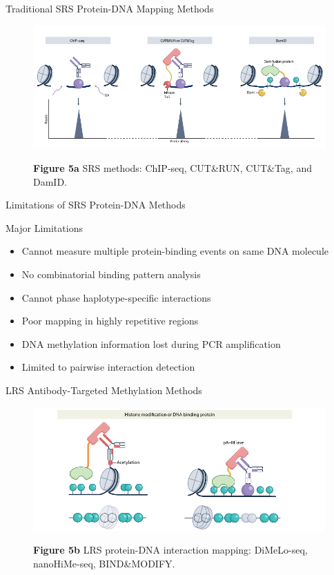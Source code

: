 \documentclass[aspectratio=169]{beamer}
\begin{document}
\begin{frame}{Traditional SRS Protein-DNA Mapping Methods}
  \begin{figure}
    \centering
    \includegraphics[height=0.5\textheight]{figures/fig5a.pdf}

    {\small \textbf{Figure 5a} \textbar{} SRS methods: ChIP-seq, CUT\&RUN, CUT\&Tag, and DamID.}
  \end{figure}
\end{frame}

\begin{frame}{Limitations of SRS Protein-DNA Methods}
  \begin{alertblock}{Major Limitations}
    \begin{itemize}
      \item Cannot measure multiple protein-binding events on same DNA molecule
      \item No combinatorial binding pattern analysis
      \item Cannot phase haplotype-specific interactions
      \item Poor mapping in highly repetitive regions
      \item DNA methylation information lost during PCR amplification
      \item Limited to pairwise interaction detection
    \end{itemize}
  \end{alertblock}
\end{frame}

\begin{frame}{LRS Antibody-Targeted Methylation Methods}
  \begin{figure}
    \centering
    \includegraphics[height=0.5\textheight]{figures/fig5b.pdf}

    {\small \textbf{Figure 5b} \textbar{} LRS protein-DNA interaction mapping: DiMeLo-seq, nanoHiMe-seq, BIND\&MODIFY.}
  \end{figure}
\end{frame}
\end{document}
